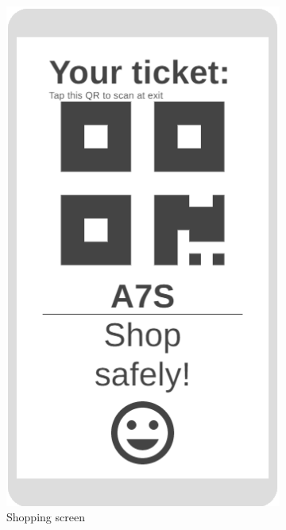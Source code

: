 \begin{figure}[h!]
	\centering
	\begin{subfigure}[b]{0.3\textwidth}
		\includegraphics[width=\linewidth]{../Diagrams/WireframesCLup/Exit.png}
		\caption{Shopping screen}
		\label{fig:WfExit}
	\end{subfigure}
	\hfill
	\begin{subfigure}[b]{0.3\textwidth}

\end{subfigure}
\end{figure}
